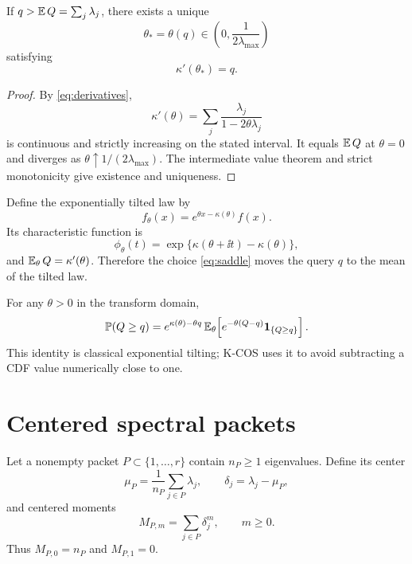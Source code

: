 \begin{theorem}
\label{thm:saddle}
If $q>\operatorname{\mathbb E} Q=\sum_j\lambda_j$, there exists a unique
\[
\theta_*=\theta(q)\in\left(0,\frac{1}{2\lambda_{\max}}\right)
\]
satisfying
\begin{equation}
\kappa'(\theta_*)=q.
\label{eq:saddle}
\end{equation}
\end{theorem}

\begin{proof}
By \eqref{eq:derivatives},
\[
\kappa'(\theta)=\sum_j\frac{\lambda_j}{1-2\theta\lambda_j}
\]
is continuous and strictly increasing on the stated interval. It equals $\operatorname{\mathbb E} Q$ at $\theta=0$ and diverges as $\theta\uparrow1/(2\lambda_{\max})$. The intermediate value theorem and strict monotonicity give existence and uniqueness.
\end{proof}

Define the exponentially tilted law by
\begin{equation}
f_{\theta}(x)=e^{\theta x-\kappa(\theta)}f(x).
\label{eq:tilt-density}
\end{equation}
Its characteristic function is
\begin{equation}
\phi_{\theta}(t)
=\exp\{\kappa(\theta+\ii t)-\kappa(\theta)\},
\label{eq:tilt-cf}
\end{equation}
and $\operatorname{\mathbb E}_{\theta}Q=\kappa'(\theta)$. Therefore the choice \eqref{eq:saddle} moves the query $q$ to the mean of the tilted law.

For any $\theta>0$ in the transform domain,
\begin{equation}
\mathbb P(Q\ge q)
=e^{\kappa(\theta)-\theta q}
\operatorname{\mathbb E}_{\theta}\!\left[e^{-\theta(Q-q)}\mathbf 1_{\{Q\ge q\}}\right].
\label{eq:tilt-tail}
\end{equation}
This identity is classical exponential tilting; K-COS uses it to avoid subtracting a CDF value numerically close to one.

\section{Centered spectral packets}

Let a nonempty packet $P\subset\{1,\ldots,r\}$ contain $n_P\ge1$ eigenvalues. Define its center
\[
\mu_P=\frac{1}{n_P}\sum_{j\in P}\lambda_j,
\qquad
\delta_j=\lambda_j-\mu_P,
\]
and centered moments
\begin{equation}
M_{P,m}=\sum_{j\in P}\delta_j^m,
\qquad m\ge0.
\label{eq:centeredmoments}
\end{equation}
Thus $M_{P,0}=n_P$ and $M_{P,1}=0$.

